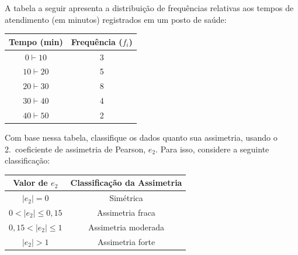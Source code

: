 %
%


\begin{exercicioBanco}[\valorquestao]
A tabela a seguir apresenta a distribuição de frequências relativas aos tempos de atendimento (em minutos) registrados em um posto de saúde:

\begin{center}
\begin{tabular}{|c|c|}
\hline
Tempo (min) & Frequência ($f_i$) \\ \hline
$0 \vdash 10$ & 3 \\ \hline
$10 \vdash 20$ & 5 \\ \hline
$20 \vdash 30$ & 8 \\ \hline
$30 \vdash 40$ & 4 \\ \hline
$40 \vdash 50$ & 2 \\ \hline
\end{tabular}
\end{center}

Com base nessa tabela, classifique os dados quanto sua assimetria, usando o 2.\textordmasculine\ coeficiente de assimetria de Pearson, \(e_2\). Para isso, considere a seguinte classificação:
\begin{center}
    \renewcommand{\arraystretch}{1.2}
    \begin{tabular}{|c|c|}
        \hline
        \textbf{Valor de } $e_2$ & \textbf{Classificação da Assimetria} \\ \hline
        $|e_2| = 0$ & Simétrica \\ \hline
        $0 < |e_2| \le 0{,}15$ & Assimetria fraca \\ \hline
        $0{,}15 < |e_2| \le 1$ & Assimetria moderada \\ \hline
        $|e_2| > 1$ & Assimetria forte \\ \hline
    \end{tabular}
\end{center}
\end{exercicioBanco}
